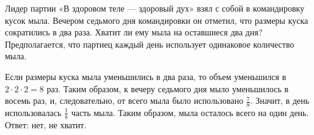 \begin{itemize}
\itC Лидер партии «В здоровом теле --- здоровый дух» взял с собой в командировку 
кусок мыла. Вечером седьмого дня командировки он отметил, что размеры куска 
сократились в два раза. Хватит ли ему мыла на оставшиеся два дня? Предполагается, 
что партиец каждый день использует одинаковое количество мыла.

\itr Если размеры куска мыла уменьшились в два раза, то объем уменьшился в 
$2\cdot 2\cdot 2=8$ раз. Таким образом, к вечеру седьмого дня мыло уменьшилось 
в восемь раз, и, следовательно, от всего мыла было использовано $\frac{7}{8}$. 
Значит, в день использовалась $\frac{1}{8}$ часть мыла. Таким образом, мыла 
осталось всего на один день. Ответ: нет, не хватит.

\end{itemize}

